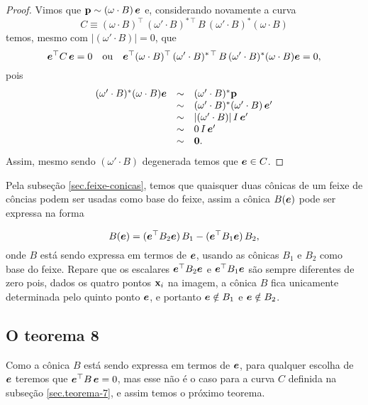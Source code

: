 \begin{proof}
 
Vimos que ${\bf p}\sim (\omega\cdot B)\,\boldsymbol{e}$ e, considerando novamente a curva 
\begin{equation*}
C \equiv (\omega \cdot B)^\top\,(\omega' \cdot B)^{*\,\top}\,B\,(\omega' \cdot B)^*(\omega \cdot B)
\end{equation*}                                      
temos, mesmo com  $|(\omega' \cdot B)|=0$, que
\begin{equation*}
\boldsymbol{e}^\top C\,\boldsymbol{e}=0\quad\text{ou}\quad
\boldsymbol{e}^\top (\omega \cdot B)^\top\,(\omega' \cdot B)^{*\,\top}\,B\,(\omega' \cdot B)^*(\omega \cdot B)\boldsymbol{e}=0,
\end{equation*}                                                pois
\begin{equation*}
\begin{array}{rcl}
(\omega' \cdot B)^*(\omega \cdot B)\boldsymbol{e}&\sim &(\omega' \cdot B)^*{\bf p}\\
&\sim &(\omega' \cdot B)^*(\omega'\cdot B)\,\boldsymbol{e}'\\
&\sim&|(\omega' \cdot B)|\,I\,\boldsymbol{e}'\\
&\sim&0\,I\,\boldsymbol{e}'\\
&\sim&{\bf 0}.
\end{array}
\end{equation*}
Assim, mesmo sendo $(\omega' \cdot B)$ degenerada temos que $\boldsymbol{e}\in C$.                                   
\end{proof}

Pela subseção \ref{sec.feixe-conicas}, temos que quaisquer duas cônicas de um feixe de côncias podem ser usadas como base do feixe, assim a cônica $B(\boldsymbol{e})$ pode ser expressa na forma

\begin{equation*}
B(\boldsymbol{e})=(\boldsymbol{e}^\top B_2\boldsymbol{e})\,B_1-(\boldsymbol{e}^\top B_1\boldsymbol{e})\,B_2,
\end{equation*} 
onde $B$ está sendo expressa em termos de $\boldsymbol{e}$, usando as cônicas $B_1$ e $B_2$ como base do feixe. Repare que os escalares $\boldsymbol{e}^\top B_2\boldsymbol{e}$ e $\boldsymbol{e}^\top B_1\boldsymbol{e}$ são sempre diferentes de zero pois, dados os quatro pontos $\mathbf{x}_i$ na imagem, a cônica $B$ fica unicamente determinada pelo quinto ponto $\boldsymbol{e}$, e portanto $\boldsymbol{e}\notin B_1$ e $\boldsymbol{e}\notin B_2$.


\subsection{O teorema 8}
Como a cônica $B$ está sendo expressa em termos de $\boldsymbol{e}$, para qualquer escolha de $\boldsymbol{e}$ teremos que $\boldsymbol{e}^\top B\,\boldsymbol{e}=0$, mas esse não é o caso para a curva $C$ definida na subseção \ref{sec.teorema-7}, e assim temos o próximo teorema.

